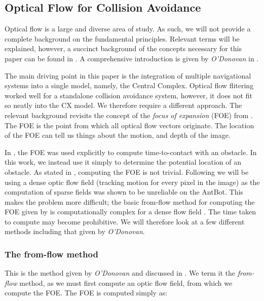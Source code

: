 \documentclass[a4paper,11pt,twoside,openright]{article}
\begin{document}
\subsection{ Optical Flow for Collision Avoidance } \label{OFBackground}
Optical flow is a large and diverse area of study. As such, we will not provide
a complete background on the fundamental principles. Relevant terms will be
explained, however, a succinct background of the concepts necessary for this
paper can be found in \cite{Mitchell2018}. A comprehensive introduction is
given by \textit{O'Donovan} in \cite{ODonovan2005}.
\newline
\par

The main driving point in this paper is the integration of multiple navigational
systems into a single model, namely, the Central Complex.
Optical flow flitering worked well for a standalone collision avoidance system,
however, it does not fit so neatly into the CX model. We therefore require a
different approach. The relevant background revisits the concept of the
\textit{focus of expansion} (FOE) from \cite{Mitchell2018, ODonovan2005}.
The FOE is the point from which all optical flow vectors originate. The location
of the FOE can tell us things about the motion, and depth of the image.
\newline
\par

In \cite{Mitchell2018}, the FOE was used explicitly to compute time-to-contact
with an obstacle. In this work, we instead use it simply to determine the
potential location of an obstacle. As stated in \cite{Burger1989}, computing the
FOE is not trivial. Following \cite{Mitchell2018} we will be using a dense
optic flow field (tracking motion for every pixel in the image) as the
computation of sparse fields was shown to be unreliable on the AntBot. This makes
the problem more difficult; the basic from-flow method for computing the FOE
given by \cite{ODonovan2005} is computationally complex for a dense flow field
\cite{Mitchell2018}. The time taken to compute may become prohibitive. We will
therefore look at a few different methods including that given by
\textit{O'Donovan}.

\subsubsection{The from-flow method}
This is the method given by \textit{O'Donovan} and discussed in
\cite{Mitchell2018}. We term it the \textit{from-flow} method, as we must first
compute an optic flow field, from which we compute the FOE. The FOE is computed
simply as:
\end{document}
